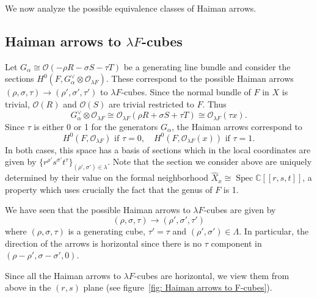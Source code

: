 \documentclass{amsart}
\theoremstyle{definition}
\newcommand{\CC} {\mathbb{C}}          %
\renewcommand{\O}{\mathcal{O}}
\newcommand{\Spec}{\operatorname{Spec}}
\renewcommand{\hat}{\widehat}
\begin{document}
We now analyze the possible equivalence classes of Haiman arrows.

\subsection{Haiman arrows to $\lambda F$-cubes}

Let $G_{\alpha}\cong \O (-\rho R-\sigma S-\tau T)$ be a generating
line bundle and consider the sections
$H^{0}(F,G_{\alpha}^{\vee}\otimes \O_{\lambda F})$. These correspond
to the possible Haiman arrows $(\rho ,\sigma ,\tau )\to (\rho ',\sigma
',\tau ')$ to $\lambda F$-cubes. Since the normal bundle of $F$ in $X$
is trivial, $\O (R)$ and $\O (S)$ are trivial restricted to $F$. Thus
\[
G_{\alpha}^{\vee}\otimes \O_{\lambda F} \cong \O_{\lambda F}(\rho
R+\sigma S+\tau T)\cong \O_{\lambda F}(\tau x).
\]
Since $\tau$ is either 0 or 1 for the generators $G_{\alpha}$, the
Haiman arrows correspond to 
\[
H^{0}(F,\O_{\lambda F})\text{  if  }\tau =0,\quad H^{0}(F,\O_{\lambda
F}(x))\text{  if  }\tau =1.
\]
In both cases, this space has a basis of sections which in the local
coordinates are given by $\{r^{\rho '}s^{\sigma '}t^{\tau } \}_{(\rho
',\sigma ')\in \lambda}$. Note that the section we consider above are
uniquely determined by their value on the formal neighborhood
$\hat{X}_{x}\cong \Spec \CC [[r,s,t]]$, a property which uses
crucially the fact that the genus of $F$ is 1.

We have seen that the possible Haiman arrows to $\lambda F$-cubes are
given by 
\[
(\rho ,\sigma ,\tau )\to (\rho ',\sigma ',\tau ')
\]
where $(\rho ,\sigma ,\tau )$ is a generating cube, $\tau '=\tau$ and
$(\rho ',\sigma ')\in \Lambda$. In particular, the direction of the
arrows is horizontal since there is no $\tau$ component in $(\rho
-\rho ',\sigma -\sigma ',0)$.

Since all the Haiman arrows to $\lambda F$-cubes are horizontal, we
view them from above in the $(r,s)$ plane (see figure~\ref{fig: Haiman arrows
to F-cubes}).
\end{document}
